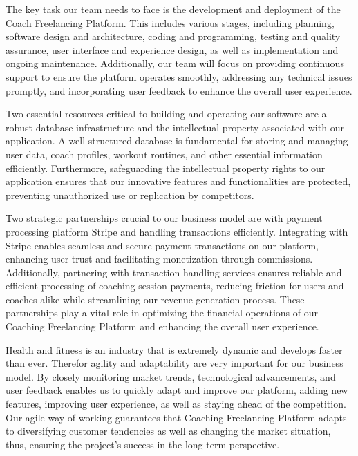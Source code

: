 \documentclass[12pt]{report}
\begin{document}
The key task our team needs to face is the development and deployment of the Coach Freelancing Platform. This includes various stages, including planning, software design and architecture, coding and programming, testing and quality assurance, user interface and experience design, as well as implementation and ongoing maintenance. Additionally, our team will focus on providing continuous support to ensure the platform operates smoothly, addressing any technical issues promptly, and incorporating user feedback to enhance the overall user experience.

Two essential resources critical to building and operating our software are a robust database infrastructure and the intellectual property associated with our application. A well-structured database is fundamental for storing and managing user data, coach profiles, workout routines, and other essential information efficiently. Furthermore, safeguarding the intellectual property rights to our application ensures that our innovative features and functionalities are protected, preventing unauthorized use or replication by competitors.

Two strategic partnerships crucial to our business model are with payment processing platform Stripe and handling transactions efficiently. Integrating with Stripe enables seamless and secure payment transactions on our platform, enhancing user trust and facilitating monetization through commissions. Additionally, partnering with transaction handling services ensures reliable and efficient processing of coaching session payments, reducing friction for users and coaches alike while streamlining our revenue generation process. These partnerships play a vital role in optimizing the financial operations of our Coaching Freelancing Platform and enhancing the overall user experience.

Health and fitness is an industry that is extremely dynamic and develops faster than ever. Therefor agility and adaptability are very important for our business model. By closely monitoring market trends, technological advancements, and user feedback enables us to quickly adapt and improve our platform, adding new features, improving user experience, as well as staying ahead of the competition. Our agile way of working guarantees that Coaching Freelancing Platform adapts to diversifying customer tendencies as well as changing the market situation, thus, ensuring the project’s success in the long-term perspective.
\end{document}
